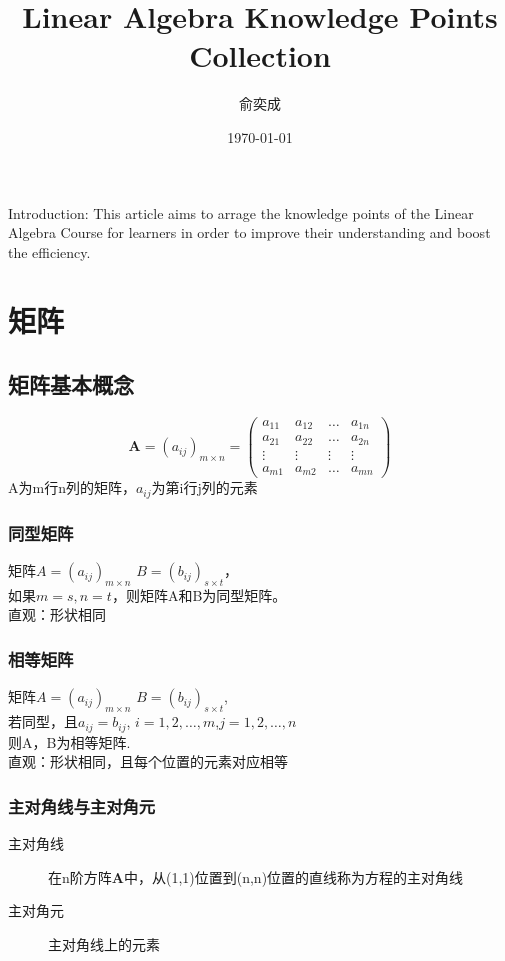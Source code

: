 \documentclass[a4paper]{ctexbook}
\begin{document}
\title{Linear Algebra Knowledge Points Collection}
\author{\kaishu 俞奕成}
\date{\kaishu \today}

\maketitle

Introduction: This article aims to arrage the knowledge points of the Linear Algebra Course for learners in order to improve their understanding and boost the efficiency.
\setcounter{tocdepth}{2}
\tableofcontents

\newpage

\part{矩阵}

\chapter{矩阵基本概念}
\[\mathbf{A}=(a_{ij})_{m\times n}=
\begin{pmatrix}
    a_{11}&a_{12}&\dots&a_{1n}
    \\a_{21}&a_{22}&\dots&a_{2n}
    \\ \vdots &\vdots &\vdots &\vdots
    \\a_{m1}&a_{m2}&\dots&a_{mn}
\end{pmatrix}\]
A为m行n列的矩阵，\(a_{ij}\)为第i行j列的元素

\section{同型矩阵}
\kaishu
矩阵\(A=(a_{ij})_{m\times n}\) \(B=(b_{ij})_{s\times t}\)，\\如果\(m=s,n=t\)，则矩阵A和B为同型矩阵。
\\直观：形状相同

\section{相等矩阵}
\kaishu
矩阵\(A=(a_{ij})_{m\times n}\) \(B=(b_{ij})_{s\times t}\),\\
若同型，且\(a_{ij}=b_{ij}\), \(i=1,2,\dots ,m\),\(j=1,2,\dots ,n\)
\\则A，B为相等矩阵.
\\直观：形状相同，且每个位置的元素对应相等

\section{主对角线与主对角元}
\begin{description}
    \item[主对角线] \kaishu 在n阶方阵\(\mathbf{A}\)中，从(1,1)位置到(n,n)位置的直线称为方程的主对角线
    \item[主对角元] \kaishu 主对角线上的元素
\end{description}
\end{document}
